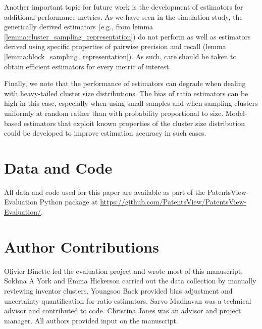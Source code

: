 \documentclass[fontsize=11pt]{article}
\newcommand{\ob}[1]{{#1}}
\theoremstyle{definition}
\begin{document}
{Another important topic for future work is the development of estimators for additional performance metrics. As we have seen in the simulation study, the generically derived estimators (e.g., from lemma \ref{lemma:cluster_sampling_representation}) do not perform as well as estimators derived using specific properties of pairwise precision and recall (lemma \ref{lemma:block_sampling_representation}). As such, care should be taken to obtain efficient estimators for every metric of interest.}

\ob{Finally, we note that the performance of estimators can degrade when dealing with heavy-tailed cluster size distributions. The bias of ratio estimators can be high in this case, especially when using small samples and when sampling clusters uniformly at random rather than with probability proportional to size. Model-based estimators that exploit known properties of the cluster size distribution could be developed to improve estimation accuracy in such cases.}


\section*{Data and Code}

All data and code used for this paper are available as part of the PatentsView-Evaluation Python package at \hyperref[https://github.com/PatentsView/PatentsView-Evaluation/]{https://github.com/PatentsView/PatentsView-Evaluation/}.


\section*{Author Contributions}

Olivier Binette led the evaluation project and wrote most of this manuscript. Sokhna A York and Emma Hickerson carried out the data collection by manually reviewing inventor clusters. Youngsoo Baek provided bias adjustment and uncertainty quantification for ratio estimators. Sarvo Madhavan was a technical advisor and contributed to code. Christina Jones was an advisor and project manager. All authors provided input on the manuscript.

\nocite{Subramanian2021}


\end{document}
